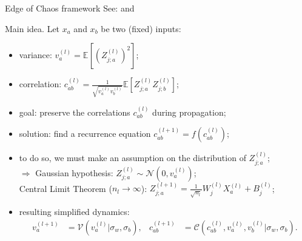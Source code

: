 \documentclass[9pt,handout]{beamer}
\begin{document}
\begin{frame}{Edge of Chaos framework}
\alert{See:} \citet{poole2016exponential} and \citet{schoenholz2016deep}

	\medskip
	
	\alert{Main idea.} Let $x_a$ and $x_b$ be two (fixed) inputs:
	\begin{itemize}
		\item variance: $v_a^{(l)} = \mathbb{E} [(Z_{j;a}^{(l)})^2]$;
		\item correlation: $c_{ab}^{(l)} = \frac{1}{\sqrt{v_a^{(l)} v_b^{(l)}}} \mathbb{E}[Z_{j;a}^{(l)} 
		Z_{j;b}^{(l)}]$; 
		\item goal: preserve the correlations $c_{ab}^{(l)}$ during propagation; 
		\item solution: find a recurrence equation $c_{ab}^{(l + 1)} = f(c_{ab}^{(l)})$; 
		\item to do so, we must make an assumption on the distribution of $Z_{j;a}^{(l)}$; \\
			$\Rightarrow$ Gaussian hypothesis: $Z_{j;a}^{(l)} \sim \mathcal{N}(0, v_a^{(l)})$; \\
			Central Limit Theorem ($n_{l} \rightarrow \infty$): $ Z^{(l + 1)}_{j;a} = \frac{1}{\sqrt{n_{l}}}W_j^{(l)} 
			X_a^{(l)} + B^{(l)}_j$; 
		\item resulting simplified dynamics: 
			\begin{align*}
				v_{a}^{(l + 1)}&= \mathcal{V}(v_{a}^{(l)} | \sigma_w, \sigma_b), & c_{ab}^{(l + 1)} &= 
				\mathcal{C}(c_{ab}^{(l)}, v_a^{(l)}, v_b^{(l)} | \sigma_w, \sigma_b) .
			\end{align*}
	\end{itemize}
\end{frame}
\end{document}
